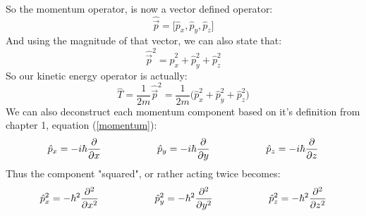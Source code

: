 \documentclass[12pt,letterpaper]{book}
\begin{document}
\paragraph*{}So the momentum operator, is now a vector defined operator:
\begin{equation}
\hat{\vec{p}} = \big[ \hat{p}_x , \hat{p}_y , \hat{p}_z \big]
\end{equation} 
And using the magnitude of that vector, we can also state that:
\begin{equation}
\hat{\vec{p}}^2 = \hat{p}_x^2 + \hat{p}_y^2 + \hat{p}_z^2 
\end{equation}
So our kinetic energy operator is actually:
\begin{equation}
\label{3D Cartesian Kinetic}
\hat{T} = \frac{1}{2m}\hat{\vec{p}}^2 = 
\frac{1}{2m}\big( \hat{p}_x^2 + \hat{p}_y^2 + \hat{p}_z^2 \big)
\end{equation}
We can also deconstruct each momentum component based on it's definition from chapter 1, equation (\ref{momentum}):
\begin{equation}
\label{momentum cartesian}
\hat{p}_x = -i\hbar \frac{\partial}{\partial x} \text{\hspace*{2cm}}
\hat{p}_y = -i\hbar \frac{\partial}{\partial y} \text{\hspace*{2cm}}
\hat{p}_z = -i\hbar \frac{\partial}{\partial z}
\end{equation}
Thus the component "squared", or rather acting twice becomes:
\begin{equation}
\label{momentum sq cartesian}
\hat{p}_x^2 = -\hbar^2 \frac{\partial^2}{\partial x^2} \text{\hspace*{2cm}}
\hat{p}_y^2 = -\hbar^2 \frac{\partial^2}{\partial y^2} \text{\hspace*{2cm}}
\hat{p}_z^2 = -\hbar^2 \frac{\partial^2}{\partial z^2}
\end{equation}
\end{document}
